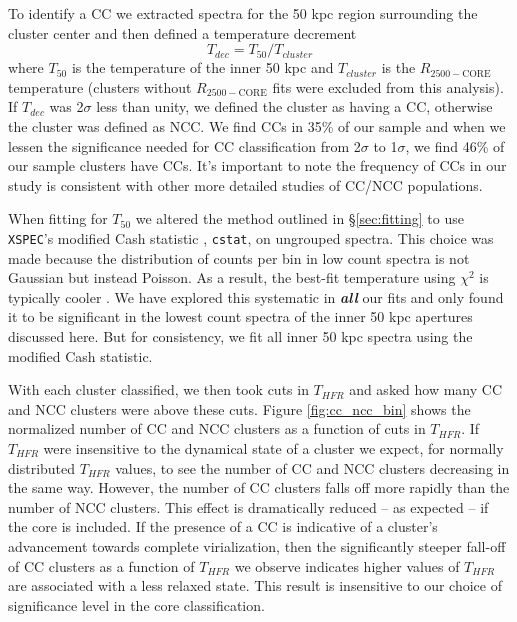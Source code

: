 \documentclass{emulateapj}
\newcommand{\rtwf}{$R_{2500-\text{CORE}}$ }
\begin{document}
To identify a CC we extracted spectra for the 50 kpc region
surrounding the cluster center and then defined a temperature
decrement 
\begin{equation}
T_{dec} = T_{50}/T_{cluster}
\label{eqn:tdec}
\end{equation}
where $T_{50}$ is the temperature of the inner 50 kpc and
$T_{cluster}$ is the \rtwf temperature (clusters without \rtwf fits
were excluded from this analysis). If $T_{dec}$ was 2$\sigma$ less than
unity, we defined the cluster as having a CC, otherwise the cluster was
defined as NCC. We find CCs in 35\% of our sample and when we lessen
the significance needed for CC classification from 2$\sigma$ to
1$\sigma$, we find 46\% of our sample clusters have CCs. It's
important to note the frequency of CCs in our study is consistent with
other more detailed studies of CC/NCC populations.

When fitting for $T_{50}$ we altered the method outlined
in \S\ref{sec:fitting} to use {\tt XSPEC}'s modified Cash statistic
\citep{1979ApJ...228..939C}, {\tt cstat}, on ungrouped
spectra. This choice was made because the distribution of counts per
bin in low count spectra is not Gaussian but instead
Poisson. As a result, the best-fit temperature using $\chi^2$ is
typically cooler \citep{1989ApJ...342.1207N, 2007A&A...462..429B}. We
have explored this systematic in {\bfseries\em{all}} our fits and
only found it to be significant in the lowest count spectra of the
inner 50 kpc apertures discussed here. But for consistency, we fit all
inner 50 kpc spectra using the modified Cash statistic.

With each cluster classified, we then took cuts in $T_{HFR}$ 
and asked how many CC and NCC clusters were above these cuts. 
Figure \ref{fig:cc_ncc_bin} shows the normalized number of CC and NCC
clusters as a function of cuts in $T_{HFR}$. If $T_{HFR}$ were insensitive to
the dynamical state of a cluster we expect, for normally
distributed $T_{HFR}$ values, to see the number of CC and NCC clusters
decreasing in the same way. However, the number of CC clusters falls off
more rapidly than the number of NCC clusters. This effect
is dramatically reduced -- as expected -- if the core is included.
If the presence of a CC is indicative of a cluster's advancement
towards complete virialization, then the significantly steeper
fall-off of CC clusters as a function of $T_{HFR}$ we observe indicates
higher values of $T_{HFR}$ are associated with a less relaxed state. This
result is insensitive to our choice of significance level in the core
classification.
\end{document}
